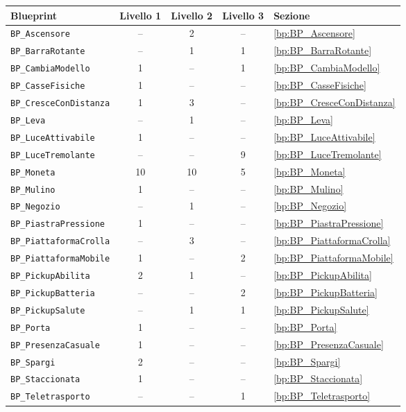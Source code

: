 \begin{longtable}{lcccl}
\toprule
Blueprint & Livello 1 & Livello 2 & Livello 3 & Sezione \\
\midrule\endhead
\texttt{BP\_Ascensore} & -- & 2 & -- & \ref{bp:BP_Ascensore} \\
\texttt{BP\_BarraRotante} & -- & 1 & 1 & \ref{bp:BP_BarraRotante} \\
\texttt{BP\_CambiaModello} & 1 & -- & 1 & \ref{bp:BP_CambiaModello} \\
\texttt{BP\_CasseFisiche} & 1 & -- & -- & \ref{bp:BP_CasseFisiche} \\
\texttt{BP\_CresceConDistanza} & 1 & 3 & -- & \ref{bp:BP_CresceConDistanza} \\
\texttt{BP\_Leva} & -- & 1 & -- & \ref{bp:BP_Leva} \\
\texttt{BP\_LuceAttivabile} & 1 & -- & -- & \ref{bp:BP_LuceAttivabile} \\
\texttt{BP\_LuceTremolante} & -- & -- & 9 & \ref{bp:BP_LuceTremolante} \\
\texttt{BP\_Moneta} & 10 & 10 & 5 & \ref{bp:BP_Moneta} \\
\texttt{BP\_Mulino} & 1 & -- & -- & \ref{bp:BP_Mulino} \\
\texttt{BP\_Negozio} & -- & 1 & -- & \ref{bp:BP_Negozio} \\
\texttt{BP\_PiastraPressione} & 1 & -- & -- & \ref{bp:BP_PiastraPressione} \\
\texttt{BP\_PiattaformaCrolla} & -- & 3 & -- & \ref{bp:BP_PiattaformaCrolla} \\
\texttt{BP\_PiattaformaMobile} & 1 & -- & 2 & \ref{bp:BP_PiattaformaMobile} \\
\texttt{BP\_PickupAbilita} & 2 & 1 & -- & \ref{bp:BP_PickupAbilita} \\
\texttt{BP\_PickupBatteria} & -- & -- & 2 & \ref{bp:BP_PickupBatteria} \\
\texttt{BP\_PickupSalute} & -- & 1 & 1 & \ref{bp:BP_PickupSalute} \\
\texttt{BP\_Porta} & 1 & -- & -- & \ref{bp:BP_Porta} \\
\texttt{BP\_PresenzaCasuale} & 1 & -- & -- & \ref{bp:BP_PresenzaCasuale} \\
\texttt{BP\_Spargi} & 2 & -- & -- & \ref{bp:BP_Spargi} \\
\texttt{BP\_Staccionata} & 1 & -- & -- & \ref{bp:BP_Staccionata} \\
\texttt{BP\_Teletrasporto} & -- & -- & 1 & \ref{bp:BP_Teletrasporto} \\

\end{longtable}
